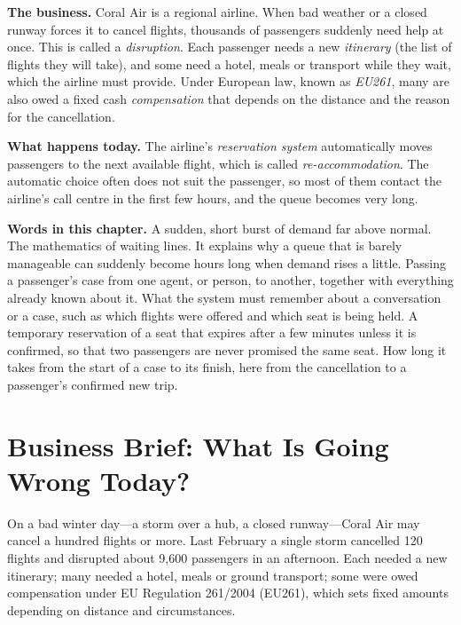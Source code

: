 \begin{beforeyoustart}
\textbf{The business.} Coral Air is a regional airline. When bad weather or a closed runway forces it to cancel flights, thousands of passengers suddenly need help at once. This is called a \emph{disruption}. Each passenger needs a new \emph{itinerary} (the list of flights they will take), and some need a hotel, meals or transport while they wait, which the airline must provide. Under European law, known as \emph{EU261}, many are also owed a fixed cash \emph{compensation} that depends on the distance and the reason for the cancellation.

\textbf{What happens today.} The airline's \emph{reservation system} automatically moves passengers to the next available flight, which is called \emph{re-accommodation}. The automatic choice often does not suit the passenger, so most of them contact the airline's call centre in the first few hours, and the queue becomes very long.

\textbf{Words in this chapter.}
 A sudden, short burst of demand far above normal.
 The mathematics of waiting lines. It explains why a queue that is barely manageable can suddenly become hours long when demand rises a little.
 Passing a passenger's case from one agent, or person, to another, together with everything already known about it.
 What the system must remember about a conversation or a case, such as which flights were offered and which seat is being held.
 A temporary reservation of a seat that expires after a few minutes unless it is confirmed, so that two passengers are never promised the same seat.
 How long it takes from the start of a case to its finish, here from the cancellation to a passenger's confirmed new trip.
\end{beforeyoustart}


\section{Business Brief: What Is Going Wrong Today?}
\label{sec:air-brief}

On a bad winter day---a storm over a hub, a closed runway---Coral Air may cancel a hundred flights or more. Last February a single storm cancelled 120 flights and disrupted about 9{,}600 passengers in an afternoon. Each needed a new itinerary; many needed a hotel, meals or ground transport; some were owed compensation under EU Regulation 261/2004 (EU261), which sets fixed amounts depending on distance and circumstances.


